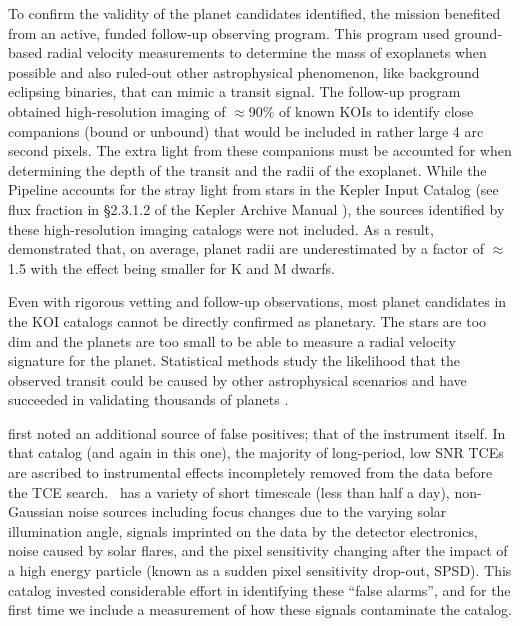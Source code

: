 {\color{blue}
To confirm the validity of the planet candidates identified, the \Kepler{} mission benefited from an active, funded follow-up observing program. This program used ground-based radial velocity measurements to determine the mass of exoplanets \citep[e.g.][]{Marcy2014} when possible and also ruled-out other astrophysical phenomenon, like background eclipsing binaries, that can mimic a transit signal.  The follow-up program obtained high-resolution imaging of $\approx$90\% of known KOIs \citep[e.g.,][]{Furlan2017} to identify close companions (bound or unbound) that would be included in  rather large 4 arc\,second pixels.  The extra light from these companions must be accounted for when determining the depth of the transit and the radii of the exoplanet.  While the \Kepler{} Pipeline accounts for the stray light from stars in the Kepler Input Catalog \citep{Brown2011} (see flux fraction in \S2.3.1.2 of the Kepler Archive Manual \citet{Thompson2014}), the sources identified by these high-resolution imaging catalogs were not included. As a result, \citet{Ciardi2015} demonstrated that, on average, planet radii are underestimated by a factor of $\approx$1.5 with the effect being smaller for K and M dwarfs.  
}


Even with rigorous vetting and follow-up observations, most planet candidates in the KOI catalogs cannot be directly confirmed as planetary. The stars are too dim and the planets are too small to be able to measure a radial velocity signature for the planet.   Statistical methods study the likelihood that the observed transit could be caused by other astrophysical scenarios and have succeeded in validating thousands of \Kepler{} planets \citep[e.g.][]{Morton2016, Torres2015,Lissauer2014, Rowe2014}.  

\citet{Mullally2015cat} first noted an additional source of false positives; that of the instrument itself. In that catalog (and again in this one), the majority of long-period, low SNR TCEs are ascribed to instrumental effects incompletely removed from the data before the TCE search. \Kepler\ has a variety of short timescale (less than half a day), non-Gaussian noise sources including focus changes due to the varying solar illumination angle, signals imprinted on the data by the detector electronics, noise caused by solar flares, and the pixel sensitivity changing after the impact of a high energy particle (known as a sudden pixel sensitivity drop-out, SPSD). This catalog invested considerable effort in identifying these ``false alarms'', and for the first time we include a measurement of how these signals contaminate the catalog.

